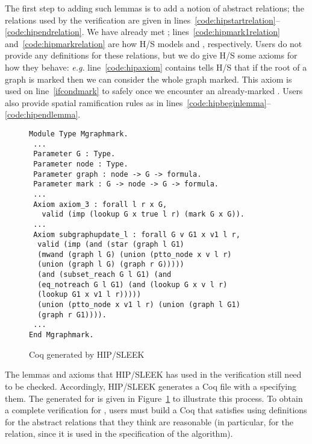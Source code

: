 The first step to adding such lemmas is to add a notion of abstract relations; the relations used by the  verification are given in lines~\ref{code:hipstartrelation}--\ref{code:hipendrelation}.  We have already met ; lines~\ref{code:hipmark1relation} and~\ref{code:hipmarkrelation} are how H/S models  and , respectively.  Users do not provide any definitions for these relations, but we do give H/S some axioms for how they behave: \emph{e.g.} line~\ref{code:hipaxiom} contains tells H/S that if the root of a graph is marked then we can consider the whole graph marked.  This axiom is used on line~\ref{ifcondmark} to safely  once we encounter an already-marked .  Users also provide spatial ramification rules as in lines~\ref{code:hipbeginlemma}--\ref{code:hipendlemma}.  %

\begin{figure}[t]
  \begin{lstlisting}
Module Type Mgraphmark.
 ...
 Parameter G : Type.
 Parameter node : Type.
 Parameter graph : node -> G -> formula.
 Parameter mark : G -> node -> G -> formula.
 ...
 Axiom axiom_3 : forall l r x G,
   valid (imp (lookup G x true l r) (mark G x G)).
 ...
 Axiom subgraphupdate_l : forall G v G1 x v1 l r,
  valid (imp (and (star (graph l G1)
  (mwand (graph l G) (union (ptto_node x v l r)
  (union (graph l G) (graph r G)))))
  (and (subset_reach G l G1) (and
  (eq_notreach G l G1) (and (lookup G x v l r)
  (lookup G1 x v1 l r)))))
  (union (ptto_node x v1 l r) (union (graph l G1)
  (graph r G1)))).
 ...
End Mgraphmark.
\end{lstlisting}
\caption{Coq  generated by HIP/SLEEK}
\label{fig:hipcoqfile}
\end{figure}

The lemmas and axioms that HIP/SLEEK has used in the verification still need to be checked.  Accordingly, HIP/SLEEK generates a Coq file with a  specifying them.  The  generated for  is given in Figure~\ref{fig:hipcoqfile} to illustrate this process.  To obtain a complete verification for , users must build a Coq  that satisfies  using definitions for the abstract relations that they think are reasonable (in particular, for the  relation, since it is used in the specification of the algorithm).

